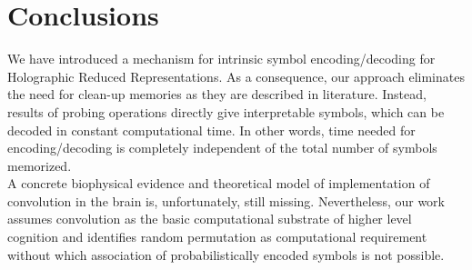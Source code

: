 \documentclass[journal]{journal}
\begin{document}
	\section{Conclusions}
	We have introduced a mechanism for intrinsic symbol encoding/decoding for Holographic Reduced Representations.
As a consequence, our approach eliminates the need for clean-up memories as they are described in literature.
Instead, results of probing operations directly give interpretable symbols, which can be decoded in constant computational time.
In other words, time needed for encoding/decoding is completely independent of the total number of symbols memorized.\\
	A concrete biophysical evidence and theoretical model of implementation of convolution in the brain is, unfortunately, still missing. Nevertheless, our work assumes convolution as the basic computational substrate of higher level cognition and identifies random permutation as computational requirement without which association of probabilistically encoded symbols is not possible.
	
	
	\printbibliography[heading=bibintoc]
	
\end{document}
